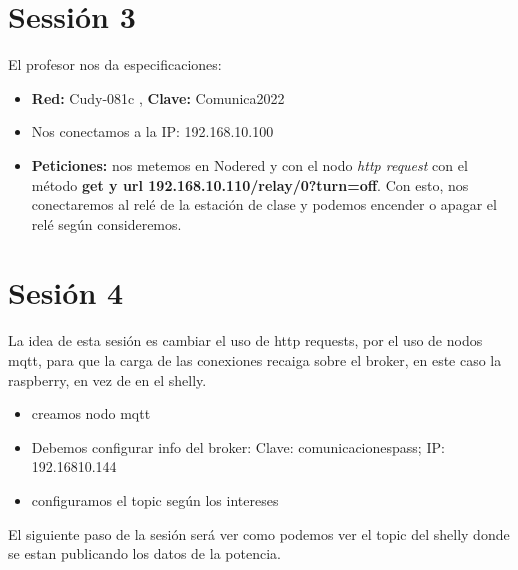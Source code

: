 \documentclass[12pt, a4paper]{article}
\begin{document}
\section{Sessión 3}



El profesor nos da especificaciones: 
\begin{itemize}
    \item \textbf{Red:} Cudy-081c ,  \textbf{Clave:} Comunica2022
    \item Nos conectamos a la IP: 192.168.10.100
    \item \textbf{Peticiones:} nos metemos en Nodered y con el 
    nodo \textit{http request} con el método \textbf{get y url 192.168.10.110/relay/0?turn=off}. Con esto, nos conectaremos al relé de 
    la estación de clase y podemos encender o apagar el relé según consideremos. 
 
\end{itemize}



\section{Sesión 4}

La idea de esta sesión es cambiar el uso de http requests, por 
el uso de nodos mqtt, para que la carga de las conexiones recaiga sobre
el broker, en este caso la raspberry, en vez de en el shelly.

\begin{itemize}
    \item creamos nodo mqtt
    \item Debemos configurar info del broker: Clave: comunicacionespass;
    IP: 192.16810.144
    \item configuramos el topic según los intereses 
\end{itemize}

El siguiente paso de la sesión será ver como podemos ver el topic del
shelly donde se estan publicando los datos de la potencia.
\end{document}
